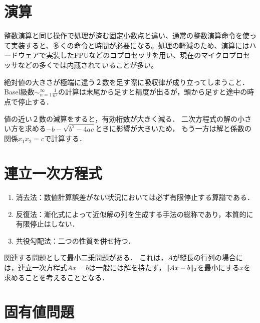 \documentclass[uplatex, dvipdfmx]{jsreport}
\begin{document}
\section{演算}

\begin{tcolorbox}[colframe=ForestGreen, colback=ForestGreen!10!white,breakable,colbacktitle=ForestGreen!40!white,coltitle=black,fonttitle=\bfseries\sffamily,
title=遠すぎる数の和，近すぎる数の差には注意．]
    整数演算と同じ操作で処理が済む固定小数点と違い、通常の整数演算命令を使って実装すると、多くの命令と時間が必要になる。処理の軽減のため、演算にはハードウェアで実装したFPUなどのコプロセッサを用い、現在のマイクロプロセッサなどの多くでは内蔵されていることが多い。 
\end{tcolorbox}

\begin{example}
    絶対値の大きさが極端に違う２数を足す際に吸収律が成り立ってしまうこと．
    Basel級数$\sim^\infty_{n=1}\frac{1}{n^2}$の計算は末尾から足すと精度が出るが，頭から足すと途中の時点で停止する．
\end{example}

\begin{example}\label{exp-loss-of-significance-in-quadratic-formula}
    値の近い２数の減算をすると，有効桁数が大きく減る．
    二次方程式の解の小さい方を求める$-b-\sqrt{b^2-4ac}$ときに影響が大きいため，
    もう一方は解と係数の関係$x_1x_2=c$で計算する．
\end{example}

\section{連立一次方程式}

\begin{enumerate}
    \item 消去法：数値計算誤差がない状況においては必ず有限停止する算譜である．
    \item 反復法：漸化式によって近似解の列を生成する手法の総称であり，本質的に有限停止はしない．
    \item 共役勾配法：二つの性質を併せ持つ．
\end{enumerate}

関連する問題として最小二乗問題がある．
これは，$A$が縦長の行列の場合には，連立一次方程式$Ax=b$は一般には解を持たず，$\|Ax-b\|_2$を最小にする$x$を求めることを考えることとなる．

\section{固有値問題}
\end{document}
